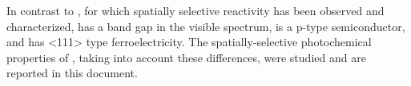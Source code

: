 In contrast to , for which spatially selective reactivity has been observed and characterized,  has a band gap in the visible spectrum, is a p-type semiconductor, and has <111> type ferroelectricity. The spatially-selective photochemical properties of , taking into account these differences, were studied and are reported in this document.

